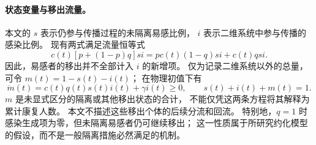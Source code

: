 \paragraph{状态变量与移出流量。}
本文的 $s$ 表示仍参与传播过程的未隔离易感比例，
$i$ 表示二维系统中参与传播的感染比例。
现有两式满足流量恒等式
\[
 c(t)[p+(1-p)q]si=pc(t)(1-q)si+c(t)qsi.
\]
因此，易感者的移出并不全部计入 $i$ 的新增项。
仅为记录二维系统以外的总量，可令 $m(t)=1-s(t)-i(t)$；
在物理初值下有
\[
 \dot m(t)=c(t)q(t)s(t)i(t)+\gamma i(t)\ge0,
 \qquad s(t)+i(t)+m(t)=1.
\]
$m$ 是未显式区分的隔离或其他移出状态的合计，
不能仅凭这两条方程将其解释为累计康复人数。
本文不描述这些移出个体的后续分流和回流。
特别地，$q=1$ 时感染生成项为零，但未隔离易感者仍可继续移出；
这一性质属于所研究约化模型的假设，而不是一般隔离措施必然满足的机制。
